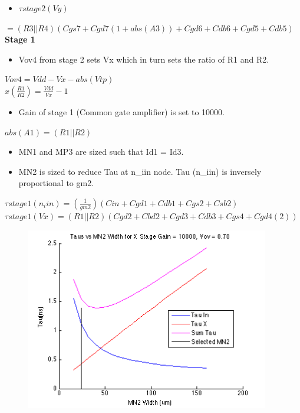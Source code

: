 \documentclass[12pt,a4paper]{article}
\begin{document}
\begin{itemize}
\item $\tau stage2 (Vy)$
\end{itemize}
$=(R3 || R4)(Cgs7+Cgd7 (1+abs(A3))+Cgd6+Cdb6+Cgd5+Cdb5)$\\




\textbf{Stage 1}

\begin{itemize}
\item Vov4 from stage 2 sets Vx which in turn sets the ratio of R1 and 
R2.
\end{itemize}


$Vov4=Vdd-Vx-abs(Vtp) $\\


$x (\frac{R1}{R2})=\frac{Vdd}{Vx}-1 $\\


\begin{itemize}
\item Gain of stage 1 (Common gate amplifier) is set to 10000.
\end{itemize}
$abs(A1)=(R1 || R2) $\\


\begin{itemize}
\item MN1 and MP3 are sized such that Id1 = Id3.
\end{itemize}


\begin{itemize}
\item MN2 is sized to reduce Tau at n\_iin node. Tau (n\_iin) is 
inversely proportional to gm2.
\end{itemize}
$\tau stage1 (n_iin)=(\frac{1}{gm2})(Cin+Cgd1+Cdb1+Cgs2+Csb2)$\\


$\tau stage1 (Vx)=(R1 || R2)(Cgd2+Cbd2+Cgd3+Cdb3+Cgs4+Cgd4 (2))$\\




\begin{figure}[h]
\centering
\includegraphics[width=10.63cm,height=7.99cm]{tau_i_x_vs_mn2.png}
\end{figure}
\end{document}
